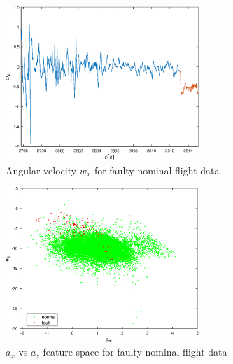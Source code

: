 \begin{figure}[H]
\begin{center}
\includegraphics[width=0.65\textwidth]{figures/gyro_x}    %
\caption{Angular velocity $w_x$  for faulty nominal flight data} 
\label{fig:gyro_x}
\end{center}
\end{figure}


\begin{figure}[H]
\begin{center}
\includegraphics[width=0.65\textwidth]{figures/feat1vsfeat3FaultStuck}    %
\caption{$a_x$ vs $a_z$ feature space for faulty nominal flight data} 
\label{fig:feat1vsfeat3FaultStuck}
\end{center}
\end{figure}

